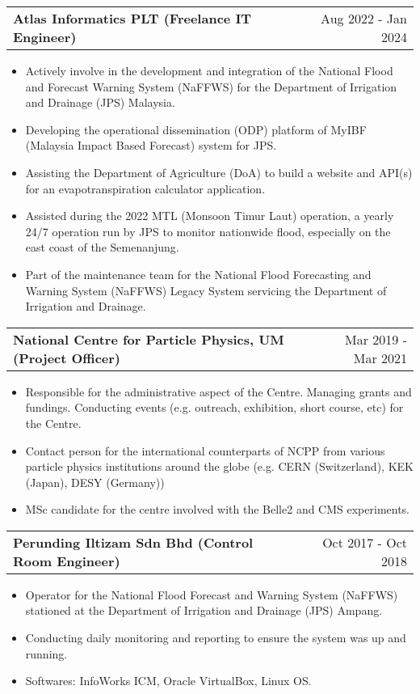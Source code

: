 \documentclass[a4paper,12pt]{article}
\makeatletter
\newenvironment{joblong}[2]
    {
    \begin{tabularx}{\linewidth}{@{}l X r@{}}
    \textbf{#1} & \hfill &  #2 \\[3.75pt]
    \end{tabularx}
    \begin{minipage}[t]{\linewidth}
    \begin{itemize}[nosep,after=\strut, leftmargin=1em, itemsep=3pt,label=--]
    }
    {
    \end{itemize}
    \end{minipage}    
    }
\makeatother
\begin{document}
\begin{joblong}{Atlas Informatics PLT (Freelance IT Engineer)}{Aug 2022 - Jan 2024}
\item Actively involve in the development and integration of the National Flood and Forecast Warning System (NaFFWS) for the Department of Irrigation and Drainage (JPS) Malaysia.
\item Developing the operational dissemination (ODP) platform of MyIBF (Malaysia Impact Based Forecast) system for JPS.
\item Assisting the Department of Agriculture (DoA) to build a website and API(s) for an evapotranspiration calculator application.
\item Assisted during the 2022 MTL (Monsoon Timur Laut) operation, a yearly 24/7 operation run by JPS to monitor nationwide flood, especially on the east coast of the Semenanjung.
\item Part of the maintenance team for the National Flood Forecasting and Warning System (NaFFWS) Legacy System servicing the Department of Irrigation and Drainage.
\end{joblong}


\begin{joblong}{National Centre for Particle Physics, UM (Project Officer)}{Mar 2019 - Mar 2021}
\item Responsible for the administrative aspect of the Centre. Managing grants and fundings. Conducting events (e.g. outreach, exhibition, short course, etc) for the Centre.
\item Contact person for the international counterparts of NCPP from various particle physics institutions around the globe (e.g. CERN (Switzerland), KEK (Japan), DESY (Germany))
\item MSc candidate for the centre involved with the Belle2 and CMS experiments.
\end{joblong}

\begin{joblong}{Perunding Iltizam Sdn Bhd (Control Room Engineer)}{Oct 2017 - Oct 2018}
\item Operator for the National Flood Forecast and Warning System (NaFFWS) stationed at the Department of Irrigation and Drainage (JPS) Ampang.
\item Conducting daily monitoring and reporting to ensure the system was up and running.
\item Softwares: InfoWorks ICM, Oracle VirtualBox, Linux OS.
\end{joblong}
\end{document}
